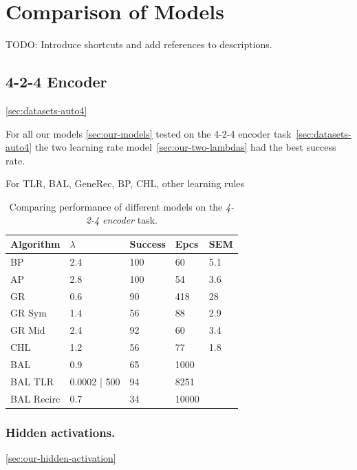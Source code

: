 
\section{Comparison of Models} 
\label{sec:results-comparison}

TODO: Introduce shortcuts and add references to descriptions. \\

\subsection{4-2-4 Encoder}
\ref{sec:datasets-auto4} 

For all our models \ref{sec:our-models} tested on the 4-2-4 encoder task~\ref{sec:datasets-auto4} the two learning rate model~\ref{sec:our-two-lambdas} had the best success rate. 

For TLR, BAL, GeneRec, BP, CHL, other learning rules

\begin{table}
  \centering
    \begin{tabular}{|l|l|l|l|l|}
    \hline
    Algorithm&$\lambda$&Success&Epcs&SEM \\
    \hline
    BP&2.4&100&60&5.1\\
    \hline
    AP&2.8&100&54&3.6\\
    \hline
    GR&0.6&90&418&28\\
    \hline
    GR Sym&1.4&56&88&2.9\\
    \hline
    GR Mid&2.4&92&60&3.4\\
    \hline
    CHL&1.2&56&77&1.8\\
    \hline
    BAL&0.9&65&1000&\\
    \hline
    BAL TLR&0.0002 | 500&94&8251&\\
    \hline
    BAL Recirc&0.7&34&10000&\\
    \hline
    \end{tabular}
  \caption{Comparing performance of different models on the \emph{4-2-4 encoder} task.} 
  \label{tab:results-cmp-auto4}
\end{table}

\subsubsection{Hidden activations.}
\ref{sec:our-hidden-activation}  

